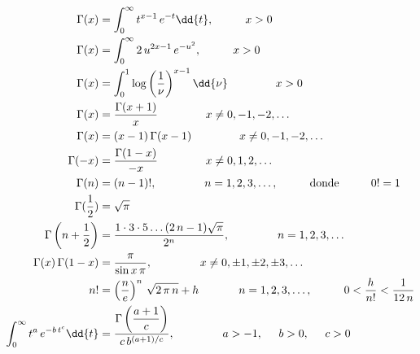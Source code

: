 \begingroup
\allowdisplaybreaks
\begin{align*}
\Gamma (x) &= \int_{0}^{\infty} t^{x-1} \, e^{-t} \dd{t} , \hspace{1cm} x > 0 \\
\Gamma (x) &= \int_{0}^{\infty} 2 \, u^{2 x - 1} \, e^{-u^{2}} , \hspace{1cm} x > 0 \\
\Gamma (x) &= \int_{0}^{1} \log \left( \dfrac{1}{\nu} \right)^{x - 1} \dd{\nu} \hspace{1.5cm} x > 0 \\
\Gamma (x) &= \dfrac{\Gamma(x + 1)}{x} \hspace{1.5cm} x \neq 0, -1, -2, \ldots \\
\Gamma (x) &= (x - 1) \, \Gamma(x - 1) \hspace{1.5cm} x \neq 0, -1, -2, \ldots \\
\Gamma (-x) &= \dfrac{\Gamma (1- x)}{-x} \hspace{1.5cm} x \neq 0, 1, 2, \ldots \\
\Gamma (n) &= (n - 1)!, \hspace{1.5cm} n = 1, 2, 3, \ldots, \hspace{1cm} \mbox{donde} \hspace{1cm} 0! = 1 \\
\Gamma (\dfrac{1}{2}) &= \sqrt{\pi} \\
\Gamma \left(n + \dfrac{1}{2} \right) &= \dfrac{1 \cdot 3 \cdot 5 \ldots (2 \, n - 1)\sqrt{\pi}}{2^{n}}, \hspace{1.5cm} n = 1, 2, 3, \ldots \\
\Gamma (x) \, \Gamma (1 - x) &= \dfrac{\pi}{\sin x \, \pi}, \hspace{1.5cm} x \neq 0, \pm 1, \pm 2, \pm 3, \ldots \\
n! &= \left( \dfrac{n}{e} \right)^{n} \, \sqrt{2 \, \pi \, n} + h \hspace{1.25cm} n = 1, 2, 3, \ldots, \hspace{1cm} 0 < \dfrac{h}{n!} < \dfrac{1}{12 \, n} \\
\int_{0}^{\infty} t^{a} \, e^{-b \, t^{c}} \dd{t} &= \dfrac{\Gamma \left(\dfrac{a + 1}{c} \right)}{c \, b^{(a+1)/c}}, \hspace{1.5cm} a > -1, \hspace{0.5cm} b > 0, \hspace{0.5cm} c >0
\end{align*}
\endgroup
\\\hspace*{\fill}

